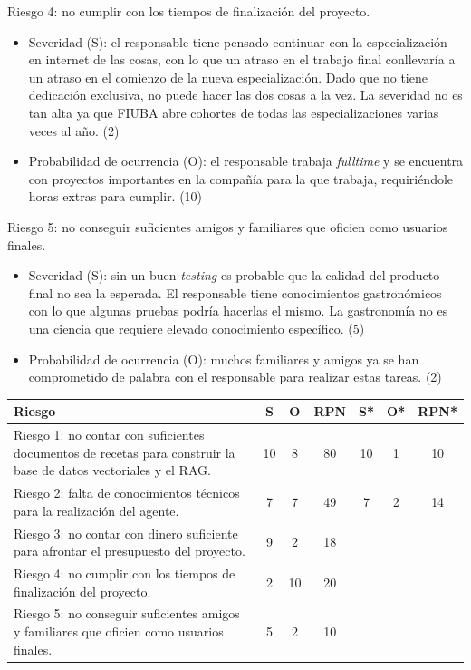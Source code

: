 \documentclass[
11pt, %
]{charter}
\begin{document}
Riesgo 4: no cumplir con los tiempos de finalización del proyecto.
\begin{itemize}
\item Severidad (S): el responsable tiene pensado continuar con la especialización en internet de las cosas, con lo que un atraso en el trabajo final conllevaría a un atraso en el comienzo de la nueva especialización. Dado que no tiene dedicación exclusiva, no puede hacer las dos cosas a la vez. La severidad no es tan alta ya que FIUBA abre cohortes de todas las especializaciones varias veces al año. (2)
\item Probabilidad de ocurrencia (O): el responsable trabaja \textit{fulltime} y se encuentra con proyectos importantes en la compañía para la que trabaja, requiriéndole horas extras para cumplir. (10)
\end{itemize}

Riesgo 5: no conseguir suficientes amigos y familiares que oficien como usuarios finales.
\begin{itemize}
\item Severidad (S): sin un buen \textit{testing} es probable que la calidad del producto final no sea la esperada. El responsable tiene conocimientos gastronómicos con lo que algunas pruebas podría hacerlas el mismo. La gastronomía no es una ciencia que requiere elevado conocimiento específico. (5)
\item Probabilidad de ocurrencia (O): muchos familiares y amigos ya se han comprometido de palabra con el responsable para realizar estas tareas. (2)
\end{itemize}



\begin{table}[htpb]
\centering
\begin{tabularx}{\linewidth}{@{}|X|c|c|c|c|c|c|@{}}
\hline
\rowcolor[HTML]{C0C0C0} 
Riesgo & S & O & RPN & S* & O* & RPN* \\ \hline
Riesgo 1: no contar con suficientes documentos de recetas para construir la base de datos vectoriales y el RAG.      & 10   & 8  &  80   & 10   &  1  &   10   \\ \hline
Riesgo 2: falta de conocimientos técnicos para la realización del agente.     & 7  & 7  &  49   & 7   &  2  &    14  \\ \hline
Riesgo 3: no contar con dinero suficiente para afrontar el presupuesto del proyecto.       & 9  & 2  &   18  &    &    &      \\ \hline
Riesgo 4: no cumplir con los tiempos de finalización del proyecto.       &  2 & 10  &   20  &    &    &      \\ \hline
Riesgo 5: no conseguir suficientes amigos y familiares que oficien como usuarios finales.       & 5  &  2 &    10 &    &    &      \\ \hline
\end{tabularx}%
\end{table}
\end{document}
